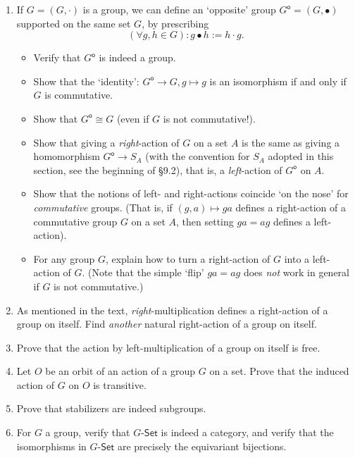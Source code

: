 \begin{enumerate}
      \item If $G = (G, \cdot)$ is a group, we can define an `opposite' group $G^\mathsf{o} = (G, \bullet)$ supported on the same set $G$, by prescribing
            \[ (\forall g, h \in G): g \bullet h := h \cdot g. \]
            \begin{itemize}
                  \item Verify that $G^\mathsf{o}$ is indeed a group.
                  \item Show that the `identity': $G^\mathsf{o} \to G, g \mapsto g$ is an isomorphism if and only if $G$ is commutative.
                  \item Show that $G^\mathsf{o} \cong G$ (even if $G$ is not commutative!).
                  \item Show that giving a \emph{right}-action of $G$ on a set $A$ is the same as giving a homomorphism $G^\mathsf{o} \to S_A$ (with the convention for $S_A$ adopted in this section, see the beginning of \S9.2), that is, a \emph{left}-action of $G^\mathsf{o}$ on $A$.
                  \item Show that the notions of left- and right-actions coincide `on the nose' for \emph{commutative} groups. (That is, if $(g, a) \mapsto ga$ defines a right-action of a commutative group $G$ on a set $A$, then setting $ga = ag$ defines a left-action).
                  \item For any group $G$, explain how to turn a right-action of $G$ into a left-action of $G$. (Note that the simple `flip' $ga = ag$ does \emph{not} work in general if $G$ is not commutative.)
            \end{itemize}

      \item As mentioned in the text, \emph{right}-multiplication defines a right-action of a group on itself. Find \emph{another} natural right-action of a group on itself.

      \item Prove that the action by left-multiplication of a group on itself is free.

      \item Let $O$ be an orbit of an action of a group $G$ on a set. Prove that the induced action of $G$ on $O$ is transitive.

      \item Prove that stabilizers are indeed subgroups.

      \item For $G$ a group, verify that $G$-$\mathsf{Set}$ is indeed a category, and verify that the isomorphisms in $G$-$\mathsf{Set}$ are precisely the equivariant bijections.


\end{enumerate}
